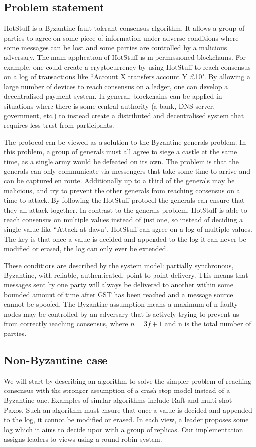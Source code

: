 \subsection{Problem statement}
HotStuff is a Byzantine fault-tolerant consensus algorithm. It allows a group of parties to agree on some piece of information under adverse conditions where some messages can be lost and some parties are controlled by a malicious adversary. The main application of HotStuff is in permissioned blockchains. For example, one could create a cryptocurrency by using HotStuff to reach consensus on a log of transactions like ``Account X transfers account Y £10". By allowing a large number of devices to reach consensus on a ledger, one can develop a decentralised payment system. In general, blockchains can be applied in situations where there is some central authority (a bank, DNS server, government, etc.) to instead create a distributed and decentralised system that requires less trust from participants.

The protocol can be viewed as a solution to the Byzantine generals problem. In this problem, a group of generals must all agree to siege a castle at the same time, as a single army would be defeated on its own. The problem is that the generals can only communicate via messengers that take some time to arrive and can be captured en route. Additionally up to a third of the generals may be malicious, and try to prevent the other generals from reaching consensus on a time to attack. By following the HotStuff protocol the generals can ensure that they all attack together. In contrast to the generals problem, HotStuff is able to reach consensus on multiple values instead of just one, so instead of deciding a single value like ``Attack at dawn", HotStuff can agree on a log of multiple values. The key is that once a value is decided and appended to the log it can never be modified or erased, the log can only ever be extended.

These conditions are described by the system model: partially synchronous, Byzantine, with reliable, authenticated, point-to-point delivery. This means that messages sent by one party will always be delivered to another within some bounded amount of time after GST has been reached and a message source cannot be spoofed. The Byzantine assumption means a maximum of n faulty nodes may be controlled by an adversary that is actively trying to prevent us from correctly reaching consensus, where $n = 3f + 1$ and n is the total number of parties.

\subsection{Non-Byzantine case}
We will start by describing an algorithm to solve the simpler problem of reaching consensus with the stronger assumption of a crash-stop model instead of a Byzantine one. Examples of similar algorithms include Raft and multi-shot Paxos. Such an algorithm must ensure that once a value is decided and appended to the log, it cannot be modified or erased. In each view, a leader proposes some log which it aims to decide upon with a group of replicas. Our implementation assigns leaders to views using a round-robin system.

